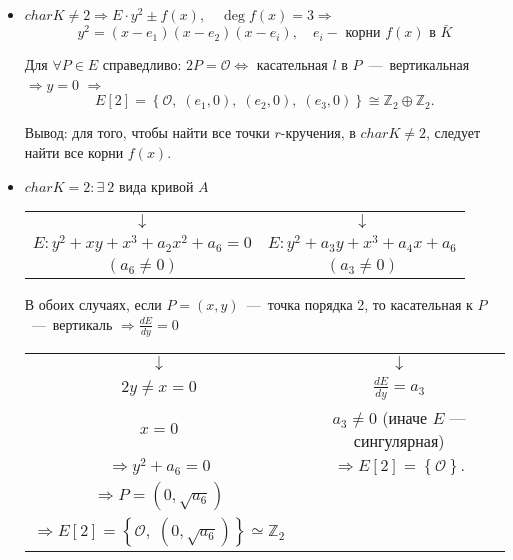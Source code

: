 \documentclass[12pt]{article}
\newcommand{\Z}{{{\mathbb Z}}}
\theoremstyle{definition}
\theoremstyle{definition}
\theoremstyle{definition}
\begin{document}
\begin{itemize}
	\item $charK \ne 2 \Rightarrow E \cdot {y^2} \pm f\left( x \right),\quad \deg f\left( x \right) = 3 \Rightarrow $
	$$
	{y^2} = \left( {x - {e_1}} \right)\left( {x - {e_2}} \right)\left( {x - {e_i}} \right),\quad {e_i} - {\text{ корни }}f\left( x \right){\text{ в }}\bar K
	$$
	
	Для $\forall P \in E$ справедливо: $2P = \mathcal{O} \Leftrightarrow $ касательная $l$ в $P$~---~вертикальная $ \Rightarrow y = 0$ $ \Rightarrow $
	$$
	E\left[ 2 \right] = \left\{ \mathcal{O},\;\left( {{e_1},0} \right),\;\left( {{e_2},0} \right),\;\left( {{e_3},0} \right) \right\} \cong {\Z_2} \oplus {\Z_2}.
	$$
	
	Вывод: для того, чтобы найти все точки $r$-кручения, в $charK \ne 2$, следует найти все корни $f(x)$.
	
	\item $charK = 2: \exists\: 2\text{ вида кривой }A$

    \begin{center}
	\begin{tabular}{c c}
		$ \downarrow $ & $ \downarrow $ \\
		$E: {y^2} + xy + {x^3} + {a_2}{x^2} + {a_6} = 0$ \quad & $E:{y^2} + {a_3}y + {x^3} + {a_4}x + {a_6}$ \\
		$\left( {{a_6} \ne 0} \right)$ & $\left( {{a_3} \ne 0} \right)$ \\
	\end{tabular}
    \end{center}

	В обоих случаях, если $P = \left( {x,y} \right)$~---~точка порядка 2, то касательная к $P$~---~вертикаль $ \Rightarrow \frac{{dE}}{{dy}} = 0$

	\begin{center}
	\begin{tabular}{c c}
		$ \downarrow $ & $ \downarrow $ \\
		$2y \ne x = 0$ & $\frac{{dE}}{{dy}} = {a_3}$ \\
		$x = 0$ & ${a_3} \ne 0$ (иначе $E$ — сингулярная) \\
		$ \Rightarrow {y^2} + {a_6} = 0$ & $ \Rightarrow E\left[ 2 \right] = \left\{\mathcal{O}\right\}.$ \\
		$ \Rightarrow P = \left( {0, \sqrt {{a_6}} } \right)$ & \\
		$ \Rightarrow E\left[ 2 \right] = \left\{ {\mathcal{O},\;\left( {0,\sqrt {a_6} } \right)} \right\} \simeq {\Z_2}$ & \\
	\end{tabular}
	\end{center}
\end{itemize}
\end{document}
